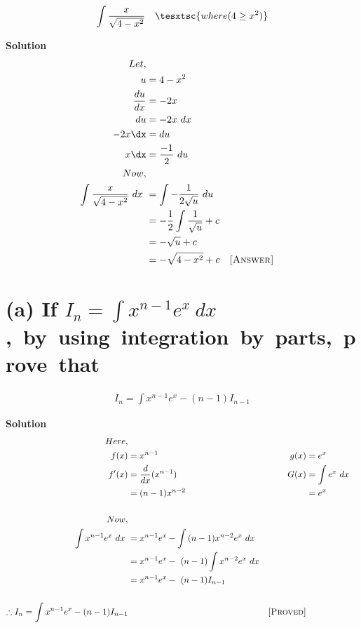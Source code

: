 \documentclass[12pt]{article}
\begin{document}
\begin{align*}
    \int\frac{x}{\sqrt{4-x^2}} & &  \tesxtsc{where (4\geq{x^2})}
\end{align*}


\textbf{Solution}
\begin{align*}
    Let,\\ u&=4-x^2\\
    \frac{du}{dx}&=-2x\\
    du&=-2x\ dx\\
    -2x\dx&=du\\
    x\dx&=\frac{-1}{2}\ du\\
    Now, \\ \int\frac{x}{\sqrt{4-x^2}}\ dx\
    &=\int-\frac{1}{2\sqrt{u}}\ du\\
    &=-\frac{1}{2}\int\frac{1}{\sqrt{u}}+c\\
    &=-\sqrt{u}+c\\
    &=-\sqrt{4-x^2}+c
     & & \textsc{[Answer]}
\end{align*}
\pagebreak


\section{(a) If $I_n = \int{x^{n-1}} {e^x}\ dx$,\ by\ using\ integration\ by\ parts,\ prove\ that}


\begin{align*}
    I_n = \int{x^{n-1}}{e^x}-(n-1)I_{n-1}
\end{align*}


\textbf{Solution}
\begin{align*}
    Here,\\  f(x)&=x^{n-1}         & g(x)&=e^{x}\\
    f{'}(x)&=\frac{d}{dx}(x^{n-1})     & G(x)&=\int{e^x}\ dx\\
    &=(n-1)x^{n-2}               &        &=e^x\\\\
    Now,\\\int {x^{n-1}}{e^x}\ dx\
    &=x^{n-1}e^x-\int{(n-1)x^{n-2}}e^x\ dx\\
    &=x^{n-1}e^x-\ (n-1)\int {x^{n-2}}{e^x}\ dx\\
    &=x^{n-1}e^x-\ (n-1)I_{n-1}\\\\
    \therefore  I_n = \int{x^{n-1}}{e^x}-(n-1)I_{n-1} 
    & & \textsc{[Proved]}
\end{align*}
\pagebreak
\end{document}
